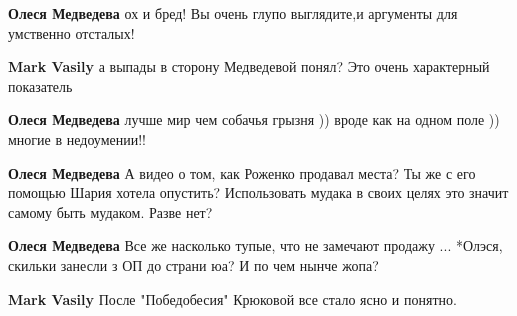 \begin{itemize}
\begin{itemize}
\textbf{Олеся Медведева} ох и бред! Вы очень глупо выглядите,и аргументы для умственно отсталых!

 
\textbf{Mark Vasily} а выпады в сторону Медведевой понял? Это очень характерный показатель

 
\textbf{Олеся Медведева} лучше мир чем собачья грызня )) вроде как на одном поле )) многие в недоумении!!

 
\textbf{Олеся Медведева} А видео о том, как Роженко продавал места? Ты же с его помощью Шария хотела опустить? Использовать мудака в своих целях это значит самому быть мудаком. Разве нет?

 
\textbf{Олеся Медведева} Все же насколько тупые, что не замечают продажу ... *Олэся, скильки занесли з ОП до страни юа? И по чем нынче жопа?

 
\textbf{Mark Vasily} После "Победобесия" Крюковой все стало ясно и понятно.

 

\end{itemize}
\end{itemize}
